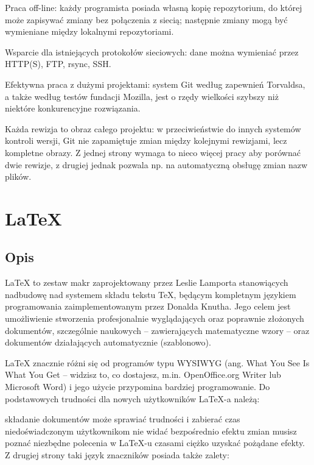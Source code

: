 \documentclass{article}
\begin{document}
Praca off-line: każdy programista posiada własną kopię repozytorium, do której może zapisywać zmiany bez połączenia z siecią; następnie zmiany mogą być wymieniane między lokalnymi repozytoriami.

Wsparcie dla istniejących protokołów sieciowych: dane można wymieniać przez HTTP(S), FTP, rsync, SSH.

Efektywna praca z dużymi projektami: system Git według zapewnień Torvaldsa, a także według testów fundacji Mozilla, jest o rzędy wielkości szybszy niż niektóre konkurencyjne rozwiązania.

Każda rewizja to obraz całego projektu: w przeciwieństwie do innych systemów kontroli wersji, Git nie zapamiętuje zmian między kolejnymi rewizjami, lecz kompletne obrazy. Z jednej strony wymaga to nieco więcej pracy aby porównać dwie rewizje, z drugiej jednak pozwala np. na automatyczną obsługę zmian nazw plików.

\newpage
\section{LaTeX}
\subsection{Opis}
LaTeX to zestaw makr zaprojektowany przez Leslie Lamporta stanowiących nadbudowę nad systemem składu tekstu TeX, będącym kompletnym językiem programowania zaimplementowanym przez Donalda Knutha. Jego celem jest umożliwienie stworzenia profesjonalnie wyglądających oraz poprawnie złożonych dokumentów, szczególnie naukowych – zawierających matematyczne wzory – oraz dokumentów działających automatycznie (szablonowo).

LaTeX znacznie różni się od programów typu WYSIWYG (ang. What You See Is What You Get – widzisz to, co dostajesz, m.in. OpenOffice.org Writer lub Microsoft Word) i jego użycie przypomina bardziej programowanie. Do podstawowych trudności dla nowych użytkowników LaTeX-a należą:

składanie dokumentów może sprawiać trudności i zabierać czas niedoświadczonym użytkownikom
nie widać bezpośrednio efektu zmian
musisz poznać niezbędne polecenia w LaTeX-u
czasami ciężko uzyskać pożądane efekty.
Z drugiej strony taki język znaczników posiada także zalety:
\end{document}
